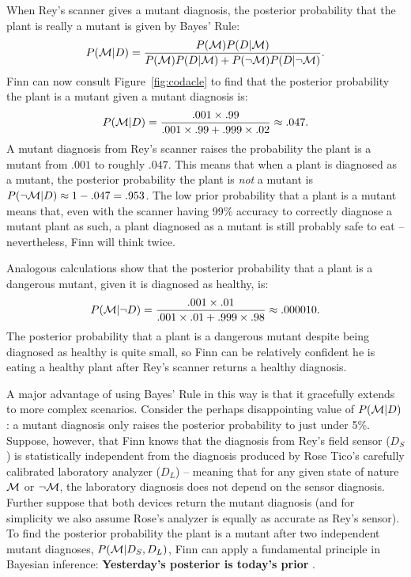 When Rey's scanner gives a mutant diagnosis, the posterior probability that the plant is really a mutant is given by Bayes' Rule: $$P({\cal M}|D) = \frac{P({\cal M})P(D|{\cal M})}{P({\cal M})P(D|{\cal M}) + P(\neg {\cal M})P(D|\neg {\cal M})}.$$ Finn can now consult Figure~\ref{fig:codacle} to find that the posterior probability the plant is a mutant given a mutant diagnosis is: $$P({\cal M}|D) = \frac{.001 \times .99}{.001 \times .99 + .999\times .02} \approx .047.$$ A mutant diagnosis from Rey's scanner raises the probability the plant is a mutant from $.001$ to roughly $.047$. This means that when a plant is diagnosed as a mutant, the posterior probability the plant is \textit{not} a mutant is $P(\neg {\cal M}|D) \approx 1 - .047 = .953$. The low prior probability that a plant is a mutant means that, even with the scanner having 99\% accuracy to correctly diagnose a mutant plant as such, a plant diagnosed as a mutant is still probably safe to eat -- nevertheless, Finn will think twice.

Analogous calculations show that the posterior probability that a plant is a dangerous mutant, given it is diagnosed as healthy, is: $$P({\cal M}|\neg D) = \frac{.001 \times .01}{.001 \times .01 + .999\times .98} \approx .000010.$$ The posterior probability that a plant is a dangerous mutant despite being diagnosed as healthy is quite small, so Finn can be relatively confident he is eating a healthy plant after Rey's scanner returns a healthy diagnosis.

A major advantage of using Bayes' Rule in this way is that it gracefully extends to more complex scenarios. Consider the perhaps disappointing value of $P({\cal M}|D)$: a mutant diagnosis only raises the posterior probability to just under 5\%. Suppose, however, that Finn knows that the diagnosis from Rey's field sensor ($D_S$) is statistically independent from the diagnosis produced by Rose Tico's {carefully calibrated} laboratory analyzer ($D_L$) -- meaning that for any given state of nature ${\cal M}$ or $\neg{{\cal M}}$, the laboratory diagnosis does not depend on the sensor diagnosis. Further suppose that both devices return the mutant diagnosis (and for simplicity we also assume Rose's analyzer is equally as accurate as Rey's sensor). To find the posterior probability the plant is a mutant after two independent mutant diagnoses, $P({\cal M}|D_S, D_L)$, Finn can apply a fundamental principle in Bayesian inference: \textbf{Yesterday's posterior is today's prior} {\cite{Lindley2000}}.

